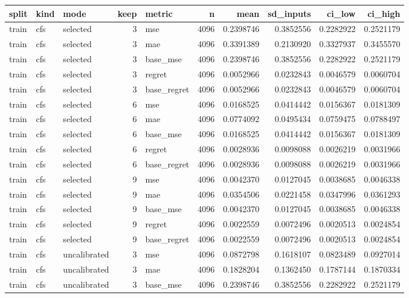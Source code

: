 \begin{tabular}{lllrlrrrrr}
\toprule
split & kind & mode & keep & metric & n & mean & sd_inputs & ci_low & ci_high \\
\midrule
train & cfs & selected & 3 & mse & 4096 & 0.2398746 & 0.3852556 & 0.2282922 & 0.2521179 \\
train & cfs & selected & 3 & mae & 4096 & 0.3391389 & 0.2130920 & 0.3327937 & 0.3455570 \\
train & cfs & selected & 3 & base_mse & 4096 & 0.2398746 & 0.3852556 & 0.2282922 & 0.2521179 \\
train & cfs & selected & 3 & regret & 4096 & 0.0052966 & 0.0232843 & 0.0046579 & 0.0060704 \\
train & cfs & selected & 3 & base_regret & 4096 & 0.0052966 & 0.0232843 & 0.0046579 & 0.0060704 \\
train & cfs & selected & 6 & mse & 4096 & 0.0168525 & 0.0414442 & 0.0156367 & 0.0181309 \\
train & cfs & selected & 6 & mae & 4096 & 0.0774092 & 0.0495434 & 0.0759475 & 0.0788497 \\
train & cfs & selected & 6 & base_mse & 4096 & 0.0168525 & 0.0414442 & 0.0156367 & 0.0181309 \\
train & cfs & selected & 6 & regret & 4096 & 0.0028936 & 0.0098088 & 0.0026219 & 0.0031966 \\
train & cfs & selected & 6 & base_regret & 4096 & 0.0028936 & 0.0098088 & 0.0026219 & 0.0031966 \\
train & cfs & selected & 9 & mse & 4096 & 0.0042370 & 0.0127045 & 0.0038685 & 0.0046338 \\
train & cfs & selected & 9 & mae & 4096 & 0.0354506 & 0.0221458 & 0.0347996 & 0.0361293 \\
train & cfs & selected & 9 & base_mse & 4096 & 0.0042370 & 0.0127045 & 0.0038685 & 0.0046338 \\
train & cfs & selected & 9 & regret & 4096 & 0.0022559 & 0.0072496 & 0.0020513 & 0.0024854 \\
train & cfs & selected & 9 & base_regret & 4096 & 0.0022559 & 0.0072496 & 0.0020513 & 0.0024854 \\
train & cfs & uncalibrated & 3 & mse & 4096 & 0.0872798 & 0.1618107 & 0.0823489 & 0.0927014 \\
train & cfs & uncalibrated & 3 & mae & 4096 & 0.1828204 & 0.1362450 & 0.1787144 & 0.1870334 \\
train & cfs & uncalibrated & 3 & base_mse & 4096 & 0.2398746 & 0.3852556 & 0.2282922 & 0.2521179 \\

\end{tabular}
